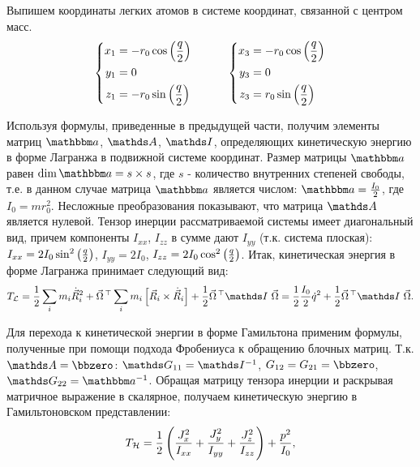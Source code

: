 Выпишем координаты легких атомов в системе координат, связанной с центром масс.
\vverh
\begin{gather}
\left\{
\begin{aligned}
x_1 &= - r_0 \cos \left( \frac{q}{2} \right) \\
y_1 &= 0 \\
z_1 &= - r_0 \sin \left( \frac{q}{2} \right) 
\end{aligned}
\right. \quad \quad \quad
\left\{
\begin{aligned}
x_3 &= - r_0 \cos \left( \frac{q}{2} \right) \\
y_3 &= 0 \\
z_3 &= r_0 \sin \left( \frac{q}{2} \right)
\end{aligned}
\right.\notag
\end{gather}

Используя формулы, приведенные в предыдущей части, получим элементы матриц $\bba$, $\bbA$, $\bbI$, определяющих кинетическую энергию в форме Лагранжа в подвижной системе координат. Размер матрицы $\bba$ равен $\dim \bba = s \times s$, где $s$ - количество внутренних степеней свободы, т.е. в данном случае матрица $\bba$ является числом: $\bba = \frac{I_0}{2}$, где $I_0 = m r_0^2$. Несложные преобразования показывают, что матрица $\bbA$ является нулевой. Тензор инерции рассматриваемой системы имеет диагональный вид, причем компоненты $I_{xx}$, $I_{zz}$ в сумме дают $I_{yy}$ (т.к. система плоская): $I_{xx} = 2 I_0 \sin^2 \left( \frac{q}{2} \right)$, $I_{yy} = 2I_0$, $I_{zz} = 2I_0 \cos^2 \left( \frac{q}{2} \right)$. Итак, кинетическая энергия 
в форме Лагранжа принимает следующий вид:
\vverh
\begin{gather}
T_\mathcal{L} = \frac{1}{2} \sum_i m_i \dot{\vec{R}}_i^2 + \vec{\Omega}^{\, \top} \sum_i m_i \left[ \vec{R}_i \times \dot{\vec{R}}_i \right] + \frac{1}{2} \vec{\Omega}^{\, \top} \bbI \ \vec{\Omega} = \frac{1}{2} \frac{I_0}{2} \dot{q}^2 + \frac{1}{2} \vec{\Omega}^{\, \top} \bbI \ \vec{\Omega}. \notag
\end{gather} 

Для перехода к кинетической энергии в форме Гамильтона применим формулы, полученные при помощи подхода Фробениуса к обращению блочных матриц. Т.к. $\bbA = \bbzero$: $\bbG_{11} = \bbI^{-1}$, $G_{12} = G_{21} = \bbzero$, $\bbG_{22} = \bba^{-1}$. Обращая матрицу тензора инерции и раскрывая матричное выражение в скалярное, получаем кинетическую энергию в Гамильтоновском представлении:
\vverh
\begin{gather}
T_\mathcal{H} = \frac{1}{2} \left( \frac{J_x^2}{I_{xx}} + \frac{J_y^2}{I_{yy}} + \frac{J_z^2}{I_{zz}} \right) + \frac{p^2}{I_0}, \notag
\end{gather}

